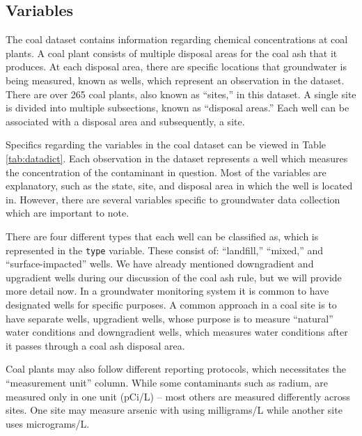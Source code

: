 \documentclass[12pt, twoside]{amherstthesis}
\begin{document}
\hypertarget{variables}{%
\subsection{Variables}\label{variables}}

The coal dataset contains information regarding chemical concentrations at coal plants. A coal plant consists of multiple disposal areas for the coal ash that it produces. At each disposal area, there are specific locations that groundwater is being measured, known as wells, which represent an observation in the dataset. There are over 265 coal plants, also known as ``sites,'' in this dataset. A single site is divided into multiple subsections, known as ``disposal areas.'' Each well can be associated with a disposal area and subsequently, a site.

Specifics regarding the variables in the coal dataset can be viewed in Table \ref{tab:datadict}. Each observation in the dataset represents a well which measures the concentration of the contaminant in question. Most of the variables are explanatory, such as the state, site, and disposal area in which the well is located in. However, there are several variables specific to groundwater data collection which are important to note.

There are four different types that each well can be classified as, which is represented in the \texttt{type} variable. These consist of: ``landfill,'' ``mixed,'' and ``surface-impacted'' wells. We have already mentioned downgradient and upgradient wells during our discussion of the coal ash rule, but we will provide more detail now. In a groundwater monitoring system it is common to have designated wells for specific purposes. A common approach in a coal site is to have separate wells, upgradient wells, whose purpose is to measure ``natural'' water conditions and downgradient wells, which measures water conditions after it passes through a coal ash disposal area.

Coal plants may also follow different reporting protocols, which necessitates the ``measurement unit'' column. While some contaminants such as radium, are measured only in one unit (pCi/L) -- most others are measured differently across sites. One site may measure arsenic with using milligrams/L while another site uses micrograms/L.
\end{document}
